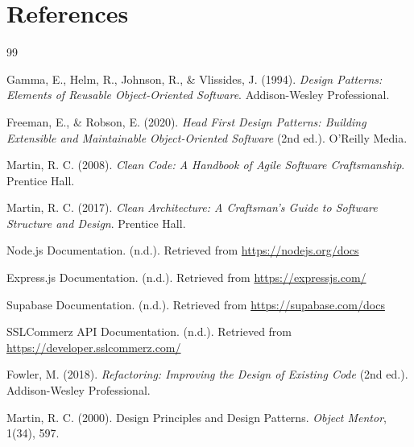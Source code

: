 \documentclass[a4paper,12pt]{report}
\begin{document}
\chapter{References}

\begin{thebibliography}{99}

Gamma, E., Helm, R., Johnson, R., \& Vlissides, J. (1994).
\textit{Design Patterns: Elements of Reusable Object-Oriented Software}.
Addison-Wesley Professional.

Freeman, E., \& Robson, E. (2020).
\textit{Head First Design Patterns: Building Extensible and Maintainable Object-Oriented Software} (2nd ed.).
O'Reilly Media.

Martin, R. C. (2008).
\textit{Clean Code: A Handbook of Agile Software Craftsmanship}.
Prentice Hall.

Martin, R. C. (2017).
\textit{Clean Architecture: A Craftsman's Guide to Software Structure and Design}.
Prentice Hall.

Node.js Documentation. (n.d.). Retrieved from \url{https://nodejs.org/docs}

Express.js Documentation. (n.d.). Retrieved from \url{https://expressjs.com/}

Supabase Documentation. (n.d.). Retrieved from \url{https://supabase.com/docs}

SSLCommerz API Documentation. (n.d.). Retrieved from \url{https://developer.sslcommerz.com/}

Fowler, M. (2018).
\textit{Refactoring: Improving the Design of Existing Code} (2nd ed.).
Addison-Wesley Professional.

Martin, R. C. (2000).
Design Principles and Design Patterns.
\textit{Object Mentor}, 1(34), 597.


\end{thebibliography}
\end{document}
